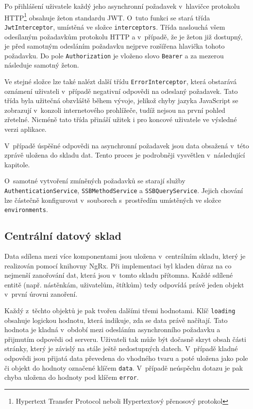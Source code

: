 Po přihlášení uživatele každý jeho asynchronní požadavek v~hlavičce protokolu HTTP\footnote{Hypertext Transfer Protocol neboli Hypertextový přenosový protokol} obsahuje žeton standardu JWT. O~tuto funkci se stará třída \texttt{JwtInterceptor}, umístěná ve složce \texttt{interceptors}. Třída naslouchá všem odesílaným požadavkům protokolu HTTP a v~případě, že je žeton již dostupný, je před samotným odesláním požadavku nejprve rozšířena hlavička tohoto požadavku. Do pole \texttt{Authorization} je vloženo slovo \texttt{Bearer} a za mezerou následuje samotný žeton.

Ve stejné složce lze také nalézt další třídu \texttt{ErrorInterceptor}, která obstarává oznámení uživateli v~případě negativní odpovědi na odeslaný požadavek. Tato třída byla užitečná obzvláště během vývoje, jelikož chyby jazyka JavaScript se zobrazují v~konzoli internetového prohlížeče, tudíž nejsou na první pohled zřetelné. Nicméně tato třída přináší užitek i pro koncové uživatele ve výsledné verzi aplikace.

V~případě úspěšné odpovědi na asynchronní požadavek jsou data obsažená v~této zprávě uložena do skladu dat. Tento proces je podrobněji vysvětlen v~následující kapitole.

O~samotné vytvoření zmíněných požadavků se starají služby \texttt{AuthenticationService}, \texttt{SSBMethodService} a \texttt{SSBQueryService}. Jejich chování lze částečně konfigurovat v~souborech s~prostředím umístěných ve složce \texttt{environments}.


\subsection{Centrální datový sklad}
Data sdílena mezi více komponentami jsou uložena v~centrálním skladu, který je realizován pomocí knihovny NgRx. Při implementaci byl kladen důraz na co nejmenší zanořování dat, která jsou v~tomto skladu přítomna. Každé sdílené entitě (např. nástěnkám, uživatelům, štítkům) tedy odpovídá právě jeden objekt v~první úrovni zanoření.

Každý z~těchto objektů je pak tvořen dalšími třemi hodnotami. Klíč \texttt{loading} obsahuje logickou hodnotu, která indikuje, zda se data právě načítají. Tato hodnota je kladná v~období mezi odesláním asynchronního požadavku a přijmutím odpovědi od serveru. Uživateli tak může být dočasně skryt obsah části stránky, který je závislý na stále ještě nedostupných datech. V~případě kladné odpovědi jsou přijatá data převedena do vhodného tvaru a poté uložena jako pole či objekt do hodnoty označené klíčem \texttt{data}. V~případě neúspěchu dotazu je pak chyba uložena do hodnoty pod klíčem \texttt{error}.

